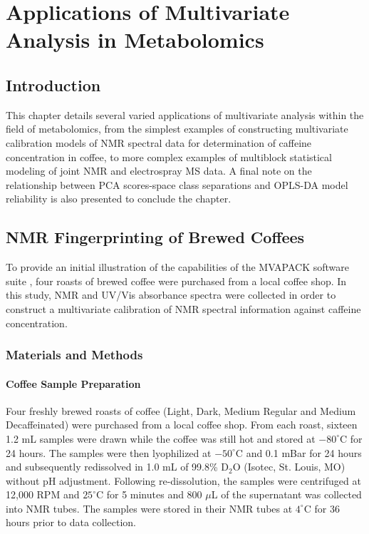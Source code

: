 
\chapter{Applications of Multivariate Analysis in Metabolomics}

\section{Introduction}

\begin{doublespace}
This chapter details several varied applications of multivariate analysis
within the field of metabolomics, from the simplest examples of constructing
multivariate calibration models of \hnmr{} NMR spectral data for determination
of caffeine concentration in coffee, to more complex examples of multiblock
statistical modeling of joint \hnmr{} NMR and electrospray MS data. A final
note on the relationship between PCA scores-space class separations and OPLS-DA
model reliability is also presented to conclude the chapter.
\end{doublespace}

\section{\hnmr{} NMR Fingerprinting of Brewed Coffees}

\begin{doublespace}
To provide an initial illustration of the capabilities of the MVAPACK software
suite \cite{worley:acscb2014}, four roasts of brewed coffee were purchased from
a local coffee shop. In this study, \hnmr{} NMR and UV/Vis absorbance spectra
were collected in order to construct a multivariate calibration of \hnmr{} NMR
spectral information against caffeine concentration.
\end{doublespace}

\subsection{Materials and Methods}

\subsubsection{Coffee Sample Preparation}

\begin{doublespace}
Four freshly brewed roasts of coffee (Light, Dark, Medium Regular and Medium
Decaffeinated) were purchased from a local coffee shop. From each roast,
sixteen 1.2 mL samples were drawn while the coffee was still hot and stored
at $-80^\circ$C for 24 hours. The samples were then lyophilized at
$-50^\circ$C and 0.1 mBar for 24 hours and subsequently redissolved in 1.0 mL
of 99.8\% D$_2$O (Isotec, St. Louis, MO) without pH adjustment. Following
re-dissolution, the samples were centrifuged at 12,000 RPM and $25^\circ$C
for 5 minutes and 800 $\mu$L of the supernatant was collected into NMR tubes.
The samples were stored in their NMR tubes at $4^\circ$C for 36 hours prior
to data collection.
\end{doublespace}

